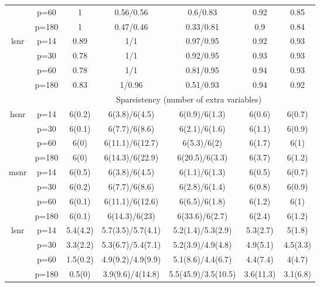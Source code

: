 \begin{table}[ht]
{\begin{tabular}{|c|c|ccccc|}
   & p=60 & 1 & 0.56/0.56 & 0.6/0.83 & 0.92 & 0.85 \\ 
   & p=180 & 1 & 0.47/0.46 & 0.33/0.81 & 0.9 & 0.84 \\ 
  \midrule\multirow{4}[2]{*}{lsnr} & p=14 & 0.89 & 1/1 & 0.97/0.95 & 0.92 & 0.93 \\ 
   & p=30 & 0.78 & 1/1 & 0.92/0.95 & 0.93 & 0.93 \\ 
   & p=60 & 0.78 & 1/1 & 0.81/0.95 & 0.94 & 0.93 \\ 
   & p=180 & 0.83 & 1/0.96 & 0.51/0.93 & 0.94 & 0.92 \\ 
   \midrule 
 \multicolumn{1}{|c}{} &       & \multicolumn{5}{c|}{Sparsistency (number of extra variables)} \\
\midrule\multirow{4}[2]{*}{hsnr} & p=14 & 6(0.2) & 6(3.8)/6(4.5) & 6(0.9)/6(1.3) & 6(0.6) & 6(0.7) \\ 
   & p=30 & 6(0.1) & 6(7.7)/6(8.6) & 6(2.1)/6(1.6) & 6(1.1) & 6(0.9) \\ 
   & p=60 & 6(0) & 6(11.1)/6(12.7) & 6(5.3)/6(2) & 6(1.7) & 6(1) \\ 
   & p=180 & 6(0) & 6(14.3)/6(22.9) & 6(20.5)/6(3.3) & 6(3.7) & 6(1.2) \\ 
  \midrule\multirow{4}[2]{*}{msnr} & p=14 & 6(0.5) & 6(3.8)/6(4.5) & 6(1.1)/6(1.3) & 6(0.5) & 6(0.7) \\ 
   & p=30 & 6(0.2) & 6(7.7)/6(8.6) & 6(2.8)/6(1.4) & 6(0.8) & 6(0.9) \\ 
   & p=60 & 6(0.1) & 6(11.1)/6(12.6) & 6(6.5)/6(1.8) & 6(1.2) & 6(1) \\ 
   & p=180 & 6(0.1) & 6(14.3)/6(23) & 6(33.6)/6(2.7) & 6(2.4) & 6(1.2) \\ 
  \midrule\multirow{4}[2]{*}{lsnr} & p=14 & 5.4(4.2) & 5.7(3.5)/5.7(4.1) & 5.2(1.4)/5.3(2.9) & 5.3(2.7) & 5(1.8) \\ 
   & p=30 & 3.3(2.2) & 5.3(6.7)/5.4(7.1) & 5.2(3.9)/4.9(4.8) & 4.9(5.1) & 4.5(3.3) \\ 
   & p=60 & 1.5(0.2) & 4.9(9.2)/4.9(9.9) & 5.1(8.6)/4.4(6.7) & 4.4(7.4) & 4(4.7) \\ 
   & p=180 & 0.5(0) & 3.9(9.6)/4(14.8) & 5.5(45.9)/3.5(10.5) & 3.6(11.3) & 3.1(6.8) \\ 
   \bottomrule 
\end{tabular}
}
\end{table}
